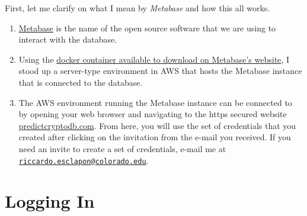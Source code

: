 \documentclass[
]{book}
\begin{document}
First, let me clarify on what I mean by \emph{Metabase} and how this all works.

\begin{enumerate}
\def\labelenumi{\arabic{enumi}.}
\item
  \href{https://www.metabase.com/}{Metabase} is the name of the open source software that we are using to interact with the database.
\item
  Using the \href{https://hub.docker.com/r/metabase/metabase/}{docker container available to download on Metabase's website}, I stood up a server-type environment in AWS that hosts the Metabase instance that is connected to the database.
\item
  The AWS environment running the Metabase instance can be connected to by opening your web browser and navigating to the https secured website \href{https://predictcryptodb.com}{predictcryptodb.com}. From here, you will use the set of credentials that you created after clicking on the invitation from the e-mail you received. If you need an invite to create a set of credentials, e-mail me at \href{mailto:riccardo.esclapon@colorado.edu}{\nolinkurl{riccardo.esclapon@colorado.edu}}.
\end{enumerate}

\hypertarget{logging-in}{%
\section{Logging In}\label{logging-in}}
\end{document}
